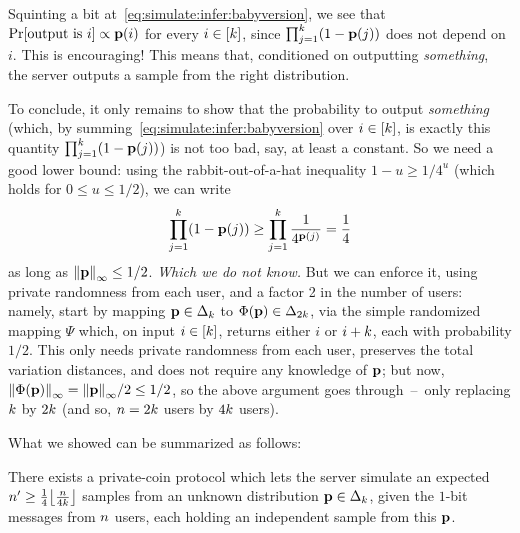 Squinting a bit at~\cref{eq:simulate:infer:babyversion}, we see that $\bPr{ \text{output is } i }\propto \p(i)$ for every $i\in[k]$, since $\prod_{j=1}^k (1-\mathbf{p}(j))$ does not depend on $i$. This is encouraging! This means that, conditioned on outputting \emph{something}, the server outputs a sample from the right distribution.

To conclude, it only remains to show that the probability to output \emph{something} (which, by summing~\cref{eq:simulate:infer:babyversion} over $i\in[k]$, is exactly this quantity $\prod_{j=1}^k (1-\mathbf{p}(j))$) is not too bad, say, at least a constant. So we need a good lower bound: using the rabbit-out-of-a-hat inequality $1-u \geq 1/4^u$ (which holds for $0\leq u \leq 1/2$), we can write
\begin{equation}
 \prod_{j=1}^k (1-\mathbf{p}(j))
\geq \prod_{j=1}^k \frac{1}{4^{\mathbf{p}(j)}} = \frac{1}{4}
\end{equation}
as long as $\norminf{\p}\leq 1/2$. \emph{Which we do not know.} But we can enforce it, using private randomness from each user, and a factor 2 in the number of users: namely, start by mapping $\mathbf{p}\in\Delta_{k}$ to $\Phi(\mathbf{p})\in\Delta_{2k}$, via the simple randomized mapping $\Psi$ which, on input $i\in[k]$, returns either $i$ or $i+k$, each with probability $1/2$. This only needs private randomness from each user, preserves the total variation distances, and does not require any knowledge of $\mathbf{p}$; but now, $\norminf{\Phi(\p)} = \norminf{\p}/2 \leq 1/2$, so the above argument goes through~--~only replacing $k$ by $2k$ (and so, $n=2k$ users by $4k$ users).

What we showed can be summarized as follows:
\begin{lemma}
	\label{theo:simulate:infer:babyversion}
There exists a private-coin protocol which lets the server simulate an expected $\ns' \geq \frac{1}{4}\flr{\frac{\ns}{4\ab}}$ \iid samples from an unknown distribution $\mathbf{p}\in\Delta_{k}$, given the $1$-bit messages from $n$ users, each holding an independent sample from this $\mathbf{p}$.
\end{lemma}

